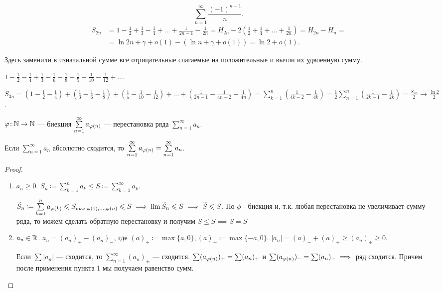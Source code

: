 \begin{example}
    \[
           \sum\limits_{n=1}^\infty \frac{(-1)^{n-1}}{n}
    .\] 
   \begin{align*}
       S_{2n}&=1-\frac{1}{2} + \frac{1}{3} - \frac{1}{4} + \ldots + \frac{1}{2n-1} - \frac{1}{2n} = H_{2n} - 2(\frac{1}{2} + \frac{1}{4} + \ldots + \frac{1}{2n}) = H_{2n} - H_n = \\ 
          &= \ln 2n+ \gamma + o(1) - (\ln n + \gamma + o(1)) = \ln 2 + o(1).
   \end{align*}

    Здесь заменили в изначальной сумме все отрицательные слагаемые на положительные и вычли их удвоенную сумму.
\end{example}
\begin{example}
    $1 - \frac{1}{2} - \frac{1}{4} + \frac{1}{3} - \frac{1}{6} - \frac{1}{8} + \frac{1}{5} - \frac{1}{10} - \frac{1}{12} + \ldots$.

    $\widetilde{S}_{3n} = (1 - \frac{1}{2} - \frac{1}{4}) + (\frac{1}{3} - \frac{1}{6} - \frac{1}{8}) + (\frac{1}{5} - \frac{1}{10} - \frac{1}{12}) + \ldots + (\frac{1}{2n - 1} - \frac{1}{4n-2} - \frac{1}{4n}) = \sum\limits_{k=1}^n(\frac{1}{4k - 2} - \frac{1}{4k}) = \frac{1}{2} \sum\limits_{n=1}^n (\frac{1}{2k-1} - \frac{1}{2k}) = \frac{S_{2n}}{2} \to \frac{\ln 2}{2}$.
\end{example}
\begin{definition}
    $\varphi\!: \mathbb{N} \to \mathbb{N}$ --- биекция $\sum\limits_{n=1}^\infty a_{\varphi(n)}$ --- перестановка ряда $\sum\limits_{n=1}^\infty a_n$.
\end{definition}
\begin{theorem}
    Если $\sum\limits_{n=1}^\infty a_n$ абсолютно сходится, то  $\sum\limits_{n=1}^\infty a_{\varphi(n)} = \sum\limits_{n=1}^\infty a_n$.
\end{theorem}
\begin{proof}
    \begin{enumerate}
        \item $a_n \ge 0$. $S_n \coloneqq \sum\limits_{k=1}^n a_k \le S \coloneqq \sum\limits_{k=1}^\infty a_k$.

            $\widetilde{S}_n \coloneqq \sum\limits_{k=1}^n a_{\varphi(k)} \leqslant S_{\max{\varphi(1), \ldots, \varphi(n)}} \leqslant S \implies \lim \widetilde{S}_n \leqslant S \implies \widetilde{S} \leqslant S$. Но $\phi$ - биекция и, т.к. любая перестановка не увеличивает сумму ряда, то можем сделать обратную перестановку и получим $S \le \widetilde{S} \implies S = \widetilde{S}$
        \item $a_n \in \mathbb{R}$.  $a_n = (a_n)_+ - (a_n)_-$, где $(a)_+ \coloneqq \max\{a, 0\}, (a)_- \coloneqq \max\{-a, 0\}$.  $|a_n| = (a)_- + (a)_+ \ge (a_n)_\pm \ge 0$.

            Если $\sum |a_n|$ --- сходится, то  $\sum\limits_{n=1}^\infty(a_n)_\pm $ --- сходится.  $\sum (a_{\varphi(n)})_+ = \sum (a_n)_+$ и  $\sum (a_{\varphi(n)})_- = \sum (a_n)_- \implies $ ряд сходится. Причем после применения пункта 1 мы получаем равенство сумм.
    \end{enumerate}
\end{proof}

